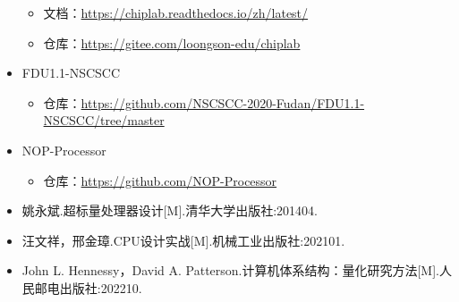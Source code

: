 \documentclass{article}
\begin{document}
\begin{itemize}
\begin{itemize}
            \item 文档：\url{https://chiplab.readthedocs.io/zh/latest/}
            \item 仓库：\url{https://gitee.com/loongson-edu/chiplab}
        \end{itemize}
    \item FDU1.1-NSCSCC
        \begin{itemize}
            \item 仓库：\url{https://github.com/NSCSCC-2020-Fudan/FDU1.1-NSCSCC/tree/master}
        \end{itemize}
    \item NOP-Processor
        \begin{itemize}
            \item 仓库：\url{https://github.com/NOP-Processor}
        \end{itemize}
    \item 姚永斌.超标量处理器设计[M].清华大学出版社:201404.
    \item 汪文祥，邢金璋.CPU设计实战[M].机械工业出版社:202101.
    \item John L. Hennessy，David A. Patterson.计算机体系结构：量化研究方法[M].人民邮电出版社:202210.
\end{itemize}
\end{document}
